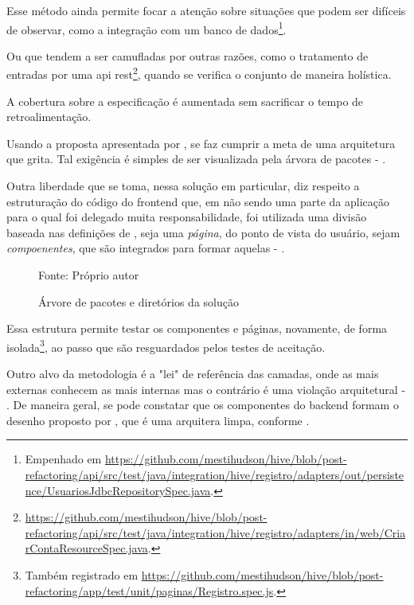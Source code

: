   Esse método ainda permite focar a atenção sobre situações que podem ser difíceis de observar, como a integração com um banco de dados\footnote{Empenhado em \url{https://github.com/mestihudson/hive/blob/post-refactoring/api/src/test/java/integration/hive/registro/adapters/out/persistence/UsuariosJdbcRepositorySpec.java}.}.

  Ou que tendem a ser camufladas por outras razões, como o tratamento de entradas por uma api rest\footnote{\url{https://github.com/mestihudson/hive/blob/post-refactoring/api/src/test/java/integration/hive/registro/adapters/in/web/CriarContaResourceSpec.java}.}, quando se verifica o conjunto de maneira holística.

  A cobertura sobre a especificação é aumentada sem sacrificar o tempo de retroalimentação.

  Usando a proposta apresentada por , se faz cumprir a meta de uma arquitetura que grita. Tal exigência é simples de ser visualizada pela árvora de pacotes - .

  Outra liberdade que se toma, nessa solução em particular, diz respeito a estruturação do código do frontend que, em não sendo uma parte da aplicação para o qual foi delegado muita responsabilidade, foi utilizada uma divisão baseada nas definições de , seja uma \emph{página}, do ponto de vista do usuário, sejam \emph{compoenentes}, que são integrados para formar aquelas - .

  \begin{figure}[htb!]
    \centering
    \caption{Árvore de pacotes e diretórios da solução}
    \small{Fonte: Próprio autor}
  \end{figure}

  Essa estrutura permite testar os componentes e páginas, novamente, de forma isolada\footnote{Também registrado em \url{https://github.com/mestihudson/hive/blob/post-refactoring/app/test/unit/paginas/Registro.spec.js}.}, ao passo que são resguardados pelos testes de aceitação.

  Outro alvo da metodologia é a "lei" de referência das camadas, onde as mais externas conhecem as mais internas mas o contrário é uma violação arquitetural - . De maneira geral, se pode constatar que os componentes do backend formam o desenho proposto por , que é uma arquitera limpa, conforme .
